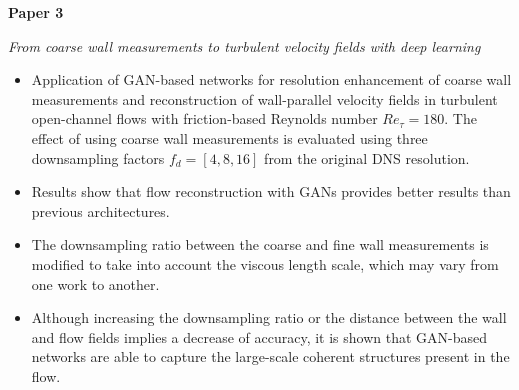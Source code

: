 \noindent\textbf{Paper 3}

\textit{From coarse wall measurements to turbulent velocity fields with deep learning}

\begin{itemize}
  \item Application of GAN-based networks for resolution enhancement of coarse wall measurements and reconstruction of wall-parallel velocity fields in turbulent open-channel flows with friction-based Reynolds number $Re_{\tau}=180$.
  The effect of using coarse wall measurements is evaluated using three downsampling factors $f_d=[4,8,16]$ from the original DNS resolution.
  \item Results show that flow reconstruction with GANs provides better results than previous architectures.
  \item The downsampling ratio between the coarse and fine wall measurements is modified to take into account the viscous length scale, which may vary from one work to another.
  \item Although increasing the downsampling ratio or the distance between the wall and flow fields implies a decrease of accuracy, it is shown that GAN-based networks are able to capture the large-scale coherent structures present in the flow.\\
\end{itemize}
